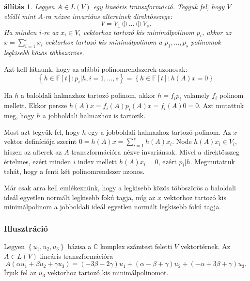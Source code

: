 \documentclass[a4paper, showtrims]{memoir}
\makeatletter
\renewenvironment{proof}[1][\proofname]
    {\par\pushQED{\qed}%
    \normalfont \topsep6\p@\@plus6\p@\relax
    \trivlist
    \item[\hskip\labelsep
        \itshape
    #1\@addpunct{:}]\ignorespaces}
    {\popQED\endtrivlist\@endpefalse}
\theoremstyle{plain}
\newtheorem{proposition}{állítás}[chapter]
\theoremstyle{remark}
\theoremstyle{definition}
\makeatother
\begin{document}
\begin{proposition}\label{pr:osszegkismp}
    Legyen \(A\in L\left( V \right)\) egy lineáris transzformáció.
    Tegyük fel, hogy \(V\) előáll mint  \(A\)-ra nézve invariáns altereinek direktösszege:
    \[
        V=
        V_1\oplus\ldots\oplus V_s.
    \]
    Ha minden \(i\)-re az \(x_i\in V_i\) vektorhoz tartozó kis minimálpolinom \(p_i\),
    akkor az \(x=\sum_{i=1}^sx_i\) vektorhoz tartozó kis minimálpolinom a 
    \(p_1,\ldots,p_s\) polinomok legkisebb közös többszöröse.
\end{proposition}
\begin{proof}
    Azt kell látnunk, hogy az alábbi polinomrendszerek azonosak:
    \[
        \left\{ h\in\mathbb{F}[t]:p_i|h, i=1,\dots,s \right\}
        =
        \left\{ h\in\mathbb{F}[t]:h\left( A \right)x=0 \right\}
    \]
    
    Ha \(h\) a baloldali halmazhoz tartozó polinom, akkor \(h=f_ip_i\) valamely \(f_i\)
    polinom mellett.
    Ekkor persze \(h\left( A \right)x
    =
    f_i\left( A \right)p_i\left( A \right)x
    =
    f_i\left( A \right)0
    =
    0
    \).
    Azt mutattuk meg, hogy \(h\) a jobboldali halmazhoz is tartozik.

    Most azt tegyük fel, hogy \(h\) egy a jobboldali halmazhoz tartozó polinom.
    Az \(x\) vektor definíciója szerint
    \(
    0
    =
    h\left(A\right)x
    =
    \sum_{i=1}^sh\left( A \right)x_i
    \).
    Node \(h\left( A \right)x_i\in V_i\), hiszen az alterek az \(A\) transzformációra nézve invariánsak.
    Mivel a direktösszeg értelmes, ezért minden \(i\) index mellett \(h\left( A \right)x_i=0\),
    ezért \(p_i|h\). 
    Megmutattuk tehát, hogy a fenti két polinomrendszer azonos.
    
    Már csak arra kell emlékeznünk, hogy a legkisebb közös többszörös a baloldali ideál egyetlen normált legkisebb fokú tagja,
    míg az \(x\) vektorhoz tartozó kis minimálpolinom a jobboldali ideál egyetlen normált legkisebb fokú tagja.
\end{proof}
\subsubsection{Illusztráció}\label{se:kisminimalillusztracio}
Legyen $\left\{ u_1,u_2,u_3 \right\}$ bázisa a $\mathbb{C}$ komplex számtest feletti $V$ vektortérnek.
Az $A\in L\left( V \right)$ lineáris transzformációra
\[
    A\left( \alpha u_1+\beta u_2 +\gamma u_3 \right)
    =
    \left( -3\beta -2\gamma \right)u_1 +
    \left( \alpha-\beta+\gamma \right)u_2+
    \left( -\alpha+3\beta+\gamma \right)u_3.
\]
Írjuk fel az $u_3$ vektorhoz tartozó kis minimálpolinomot.
\end{document}

